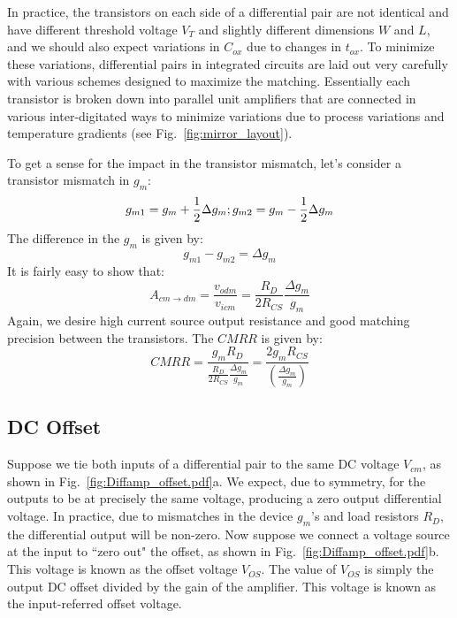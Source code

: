 In practice, the transistors on each side of a differential pair are not identical and have different threshold voltage $V_T$ and slightly different dimensions $W$ and $L$, and we should also expect variations in $C_{ox}$ due to changes in $t_{ox}$.  To minimize these variations, differential pairs in integrated circuits are laid out very carefully with various schemes designed to maximize the matching.  Essentially each transistor is broken down into parallel unit amplifiers that are connected in various inter-digitated ways to minimize variations due to process variations and temperature gradients (see Fig.~\ref{fig:mirror_layout}).

To get a sense for the impact in the transistor mismatch, let's consider a transistor mismatch in $g_m$:
%
\begin{equation} 
	{g_{m1}} = {g_m} + \frac{1}{2}\Delta {g_m};{\rm{         }}{g_{m2}} = {g_m} - \frac{1}{2}\Delta {g_m}
\end{equation}
%
The difference in the $g_m$ is given by:
\begin{equation}
	{g_{m1}} - {g_{m2}} = \Delta {g_m}
\end{equation}
%
It is fairly easy to show that:
%
\begin{equation}
	{A_{cm \to dm }} = \frac{{{v_{odm}}}}{{{v_{icm}}}} = \frac{{{R_D}}}{{2{R_{CS}}}}\frac{{\Delta {g_m}}}{{{g_m}}}
\end{equation}
%
Again, we desire high current source output resistance and good matching precision between the transistors.  The $CMRR$ is given by:
\begin{equation}
	CMRR  =  \frac{{{g_m}{R_D}}}{{\frac{{{R_D}}}{{2{R_{CS}}}}\frac{{\Delta {g_m}}}{{{g_m}}}}} = \frac{{2{g_m}{R_{CS}}}}{{\left( {\frac{{\Delta {g_m}}}{{{g_m}}}} \right)}} 
\end{equation}





\subsection{DC Offset}

Suppose we tie both inputs of a differential pair to the same DC voltage $V_{cm}$, as shown in Fig.~\ref{fig:Diffamp_offset.pdf}a.  We expect, due to symmetry, for the outputs to be at precisely the same voltage, producing a zero output differential voltage.  In practice, due to mismatches in the device $g_m$'s and load resistors $R_D$, the differential output will be non-zero.  Now suppose we connect a voltage source at the input to ``zero out" the offset, as shown in Fig.~\ref{fig:Diffamp_offset.pdf}b.  This voltage is known as the offset voltage $V_{OS}$.  The value of $V_{OS}$ is simply the output DC offset divided by the gain of the amplifier.  This voltage is known as the input-referred offset voltage.






